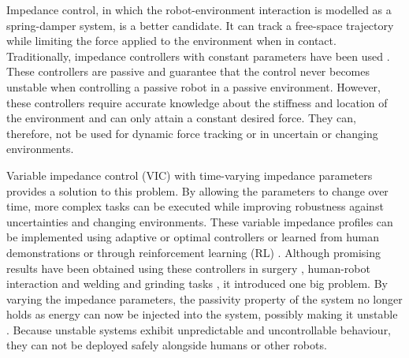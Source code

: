 Impedance control, in which the robot-environment interaction is modelled as a spring-damper system, is a better candidate. It can track a free-space trajectory while limiting the force applied to the environment when in contact. Traditionally, impedance controllers with constant parameters have been used \cite{hoganImpedanceControlApproach1985,hoganStableExecutionContact1987,calancaReviewAlgorithmsCompliant2016,songTutorialSurveyComparison2019,cheahLearningImpedanceControl1998,liHumanRobotCollaboration2013,heAdaptiveNeuralImpedance2015,liAdaptiveImpedanceControl2016,jamwalImpedanceControlIntrinsically2016,jungForceTrackingImpedance2004,ottPrioritizedMultitaskCompliance2015}. These controllers are passive and guarantee that the control never becomes unstable when controlling a passive robot in a passive environment. However, these controllers require accurate knowledge about the stiffness and location of the environment and can only attain a constant desired force. They can, therefore, not be used for dynamic force tracking or in uncertain or changing environments.

Variable impedance control (VIC) with time-varying impedance parameters provides a solution to this problem. By allowing the parameters to change over time, more complex tasks can be executed while improving robustness against uncertainties and changing environments. These variable impedance profiles can be implemented using adaptive or optimal controllers \cite{songTutorialSurveyComparison2019,erdenAssistingManualWelding2011,erdenRoboticAssistanceImpedance2016,leeForceTrackingImpedance2008,ikeuraOptimalVariableImpedance2002,medinaRisksensitiveInteractionControl2013,yangHumanlikeAdaptationForce2011} or learned from human demonstrations or through reinforcement learning (RL) \cite{buchliLearningVariableImpedance2011,rombokasTendondrivenVariableImpedance2013a,michelBilateralTeleoperationAdaptive2021,chenClosedLoopVariableStiffness2021,weiImpedanceControlUncertain2019,houVariableImpedanceControl2020,abu-dakkaVariableImpedanceControl2020,calinonLearningbasedControlStrategy2010,kronanderOnlineLearningVarying2012}. Although promising results have been obtained using these controllers in surgery \cite{ferragutiEnergyTankBasedInteractive2015, ferragutiTankbasedApproachImpedance2013}, human-robot interaction \cite{wuAdaptiveImpedanceControl2020,san-miguelAutomatedOffLineGeneration2022,sharifiImpedanceLearningBasedAdaptive2021} and welding and grinding tasks \cite{erdenAssistingManualWelding2011,erdenRoboticAssistanceImpedance2016,zhangLearningImpedanceRegulation2021,wangSafeOnlineGain2021}, it introduced one big problem. By varying the impedance parameters, the passivity property of the system no longer holds as energy can now be injected into the system, possibly making it unstable \cite{ferragutiTankbasedApproachImpedance2013}. Because unstable systems exhibit unpredictable and uncontrollable behaviour, they can not be deployed safely alongside humans or other robots.

